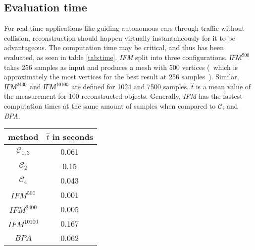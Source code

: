 \subsection{Evaluation time}
For real-time applications like guiding autonomous cars through traffic without collision,
 reconstruction should happen virtually instantaneously for it to be advantageous. 
 The computation time may be critical, and thus has been evaluated, as seen in table
  \ref{tab:time}. 
\emph{IFM} split into three configurations. $\emph{IFM}^{500}$ takes 256 samples as input 
and produces a mesh with 500 vertices (~which is approximately the most vertices for the best
 result at 256 samples~). Similar, $\emph{IFM}^{2400}$ and $\emph{IFM}^{10100}$ are defined 
 for 1024 and 7500 samples.
$\hat{t}$ is a mean value of the measurement for 100 reconstructed objects. 
Generally, \emph{IFM} has the fastest computation times at the same amount of samples when compared to $\mathcal{C}_i$ and \emph{BPA}.
\begin{center}
     \label{tab:time} 
        \begin{tabular}{| c | c |}
            \hline
            method & $\hat{t}$ in seconds \\\hline
            $\mathcal{C}_{1,3}$ & 0.061 \\\hline
             $\mathcal{C}_2$ & 0.15 \\\hline
             $\mathcal{C}_4$ & 0.043 \\\hline
             $IFM^{500}$ & 0.001 \\\hline
             $IFM^{2400}$ & 0.005 \\\hline
             $IFM^{10100}$ & 0.167 \\\hline
             $BPA$ & 0.062 \\\hline
        \end{tabular}
\end{center}


